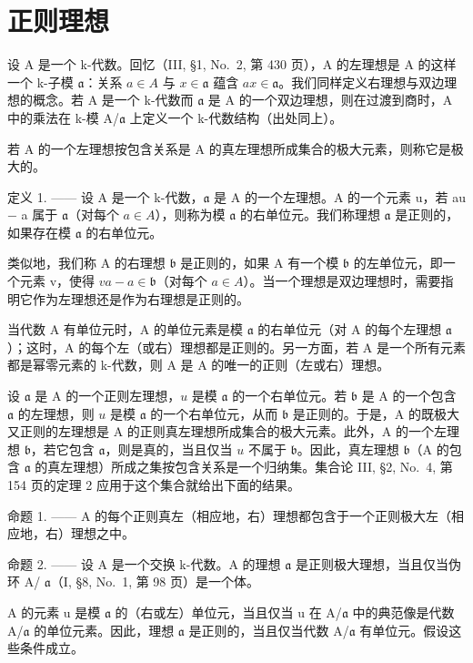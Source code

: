 \section{正则理想}

设 A 是一个 k-代数。回忆（III, §1, No.~2, 第 430 页），A 的左理想是 A 的这样一个 k-子模 \(\mathfrak{a}\)：关系 \(a \in A\) 与 \(x \in \mathfrak{a}\) 蕴含 \(ax \in \mathfrak{a}\)。我们同样定义右理想与双边理想的概念。若 A 是一个 k-代数而 \(\mathfrak{a}\) 是 A 的一个双边理想，则在过渡到商时，A 中的乘法在 k-模 A/\(\mathfrak{a}\) 上定义一个 k-代数结构（出处同上）。

若 A 的一个左理想按包含关系是 A 的真左理想所成集合的极大元素，则称它是极大的。

定义 1. —— 设 A 是一个 k-代数，\(\mathfrak{a}\) 是 A 的一个左理想。A 的一个元素 u，若 au − a 属于 \(\mathfrak{a}\)（对每个 \(a \in A\)），则称为模 \(\mathfrak{a}\) 的右单位元。我们称理想 \(\mathfrak{a}\) 是正则的，如果存在模 \(\mathfrak{a}\) 的右单位元。

类似地，我们称 A 的右理想 \(\mathfrak{b}\) 是正则的，如果 A 有一个模 \(\mathfrak{b}\) 的左单位元，即一个元素 v，使得 \(va - a \in \mathfrak{b}\)（对每个 \(a \in A\)）。当一个理想是双边理想时，需要指明它作为左理想还是作为右理想是正则的。

当代数 A 有单位元时，A 的单位元素是模 \(\mathfrak{a}\) 的右单位元（对 A 的每个左理想 \(\mathfrak{a}\)）；这时，A 的每个左（或右）理想都是正则的。另一方面，若 A 是一个所有元素都是幂零元素的 k-代数，则 A 是 A 的唯一的正则（左或右）理想。

设 \(\mathfrak{a}\) 是 A 的一个正则左理想，\(u\) 是模 \(\mathfrak{a}\) 的一个右单位元。若 \(\mathfrak{b}\) 是 A 的一个包含 \(\mathfrak{a}\) 的左理想，则 \(u\) 是模 \(\mathfrak{a}\) 的一个右单位元，从而 \(\mathfrak{b}\) 是正则的。于是，A 的既极大又正则的左理想是 A 的正则真左理想所成集合的极大元素。此外，A 的一个左理想 \(\mathfrak{b}\)，若它包含 \(\mathfrak{a}\)，则是真的，当且仅当 \(u\) 不属于 \(\mathfrak{b}\)。因此，真左理想 \(\mathfrak{b}\)（A 的包含 \(\mathfrak{a}\) 的真左理想）所成之集按包含关系是一个归纳集。集合论 III, §2, No.~4, 第 154 页的定理 2 应用于这个集合就给出下面的结果。

命题 1. —— A 的每个正则真左（相应地，右）理想都包含于一个正则极大左（相应地，右）理想之中。

命题 2. —— 设 A 是一个交换 k-代数。A 的理想 \(\mathfrak{a}\) 是正则极大理想，当且仅当伪环 A/ \(\mathfrak{a}\)（I, §8, No.~1, 第 98 页）是一个体。

A 的元素 u 是模 \(\mathfrak{a}\) 的（右或左）单位元，当且仅当 u 在 A/\(\mathfrak{a}\) 中的典范像是代数 A/\(\mathfrak{a}\) 的单位元素。因此，理想 \(\mathfrak{a}\) 是正则的，当且仅当代数 A/\(\mathfrak{a}\) 有单位元。假设这些条件成立。

